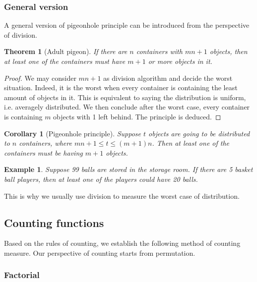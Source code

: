 \documentclass[12pt]{article}
\newtheorem*{theorem}{Theorem}
\newtheorem*{corollary}{Corollary}
\newtheorem*{example}{Example}
\begin{document}
    \subsubsection*{General version}

    A general version of pigeonhole principle can be introduced from the perspective of division.

    \begin{theorem}[Adult pigeon]
        If there are $n$ containers with $mn+1$ objects, then at least one of the containers must have $m+1$ or more objects in it.
    \end{theorem}

    \begin{proof}
        We may consider $mn+1$ as division algorithm and decide the worst situation. Indeed, it is the worst when every container is containing the least amount of objects in it. This is equivalent to saying the distribution is uniform, i.e. averagely distributed. We then conclude after the worst case, every container is containing $m$ objects with 1 left behind. The principle is deduced.
    \end{proof}

    \begin{corollary}[Pigeonhole principle]
        Suppose $t$ objects are going to be distributed to $n$ containers, where $mn+1\leq t\leq (m+1)n$. Then at least one of the containers must be having $m+1$ objects.
    \end{corollary}

    \begin{example}
        Suppose 99 balls are stored in the storage room. If there are 5 basket ball players, then at least one of the players could have 20 balls.
    \end{example}

    This is why we usually use division to measure the worst case of distribution.

    \subsection{Counting functions}

    Based on the rules of counting, we establish the following method of counting measure. Our perspective of counting starts from permutation.

    \subsubsection*{Factorial}
\end{document}
